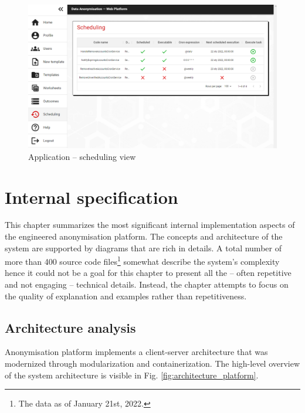 \documentclass[a4paper,twoside,12pt]{book}
\begin{document}
\begin{figure}
  \centering
  \includegraphics[width=\linewidth]{img/app_scheduling.png}
  \caption{Application -- scheduling view}
  \label{fig:app_scheduling}
\end{figure}


\chapter{Internal specification}

This chapter summarizes the most significant internal implementation aspects of the engineered anonymisation platform. The concepts and architecture of the system are supported by diagrams that are rich in details. A total number of more than 400 source code files\footnote{The data as of January 21st, 2022.} somewhat describe the system's complexity hence it could not be a goal for this chapter to present all the -- often repetitive and not engaging -- technical details. Instead, the chapter attempts to focus on the quality of explanation and examples rather than repetitiveness.

\section{Architecture analysis}

Anonymisation platform implements a client-server architecture that was modernized through modularization and containerization. The high-level overview of the system architecture is visible in Fig. \ref{fig:architecture_platform}.
\end{document}
